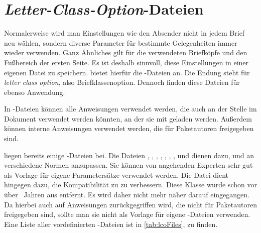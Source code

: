 \section{\emph{Letter-Class-Option}-Dateien}
%
\BeginIndexGroup
{}%
%

Normalerweise wird man Einstellungen wie den Absender nicht in jedem Brief neu
wählen, sondern diverse Parameter für bestimmte Gelegenheiten immer wieder
verwenden. Ganz Ähnliches gilt für die verwendeten Briefköpfe und den
Fußbereich der ersten Seite. Es ist deshalb sinnvoll, diese Einstellungen in
einer eigenen Datei zu speichern. \KOMAScript{} bietet
hierfür die -Dateien an. Die Endung  steht
für \emph{\emph{l}etter \emph{c}lass \emph{o}ption}, also
Briefklassenoption. Dennoch finden diese Dateien für 
ebenso Anwendung.

In -Dateien können alle Anweisungen verwendet werden, die auch an
der Stelle im Dokument verwendet werden könnten, an der
sie mit 
geladen werden. Außerdem können interne Anweisungen verwendet werden, die für
Paketautoren freigegeben sind.%
\iffalse %
Bei \Class{scrlttr2} und \Package{scrletter}
sind dies insbesondere die Anweisungen
\DescRef{\LabelBase.cmd.newplength}\IndexCmd{newplength},
\DescRef{\LabelBase.cmd.setplength}\IndexCmd{setplength} und
\DescRef{\LabelBase.cmd.addtoplength}\IndexCmd{addtoplength} (siehe
\autoref{sec:\LabelBase.pseudoLength}).%
\fi

\KOMAScript{} liegen bereits einige -Dateien bei. Die Dateien
, ,
,
, ,
, ,  und
 dienen dazu, 
und  an verschiedene Normen anzupassen. Sie
können von angehenden Experten sehr gut als Vorlage für eigene Parametersätze
verwendet werden. Die Datei  dient hingegen dazu, die
Kompatibilität zu  zu verbessern. Diese
Klasse wurde schon vor über \the\numexpr {}\relax~Jahren aus
\KOMAScript{} entfernt. Es wird daher nicht mehr näher darauf eingegangen. Da
hierbei auch auf Anweisungen zurückgegriffen wird, die nicht für Paketautoren
freigegeben sind, sollte man sie nicht als Vorlage für eigene
-Dateien verwenden. Eine Liste aller vordefinierten
-Dateien ist in \autoref{tab:lcoFiles}, 
zu finden.

